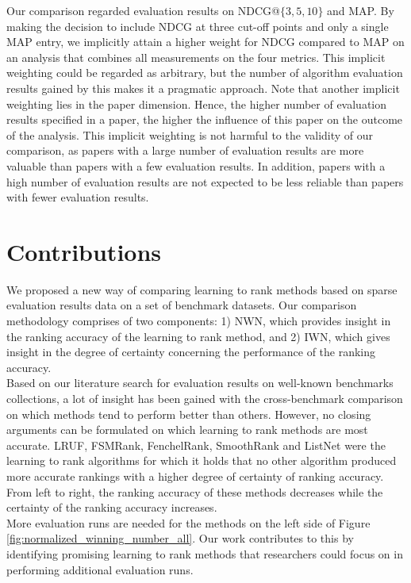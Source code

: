 \documentclass{sig-alternate}
\begin{document}
Our comparison regarded evaluation results on NDCG@$\{3,5,10\}$ and MAP. By making the decision to include NDCG at three cut-off points and only a single MAP entry, we implicitly attain a higher weight for NDCG compared to MAP on an analysis that combines all measurements on the four metrics. This implicit weighting could be regarded as arbitrary, but the number of algorithm evaluation results gained by this makes it a pragmatic approach. Note that another implicit weighting lies in the paper dimension. Hence, the higher number of evaluation results specified in a paper, the higher the influence of this paper on the outcome of the analysis. This implicit weighting is not harmful to the validity of our comparison, as papers with a large number of evaluation results are more valuable than papers with a few evaluation results. In addition, papers with a high number of evaluation results are not expected to be less reliable than papers with fewer evaluation results.

\section{Contributions}
We proposed a new way of comparing learning to rank methods based on sparse evaluation results data on a set of benchmark datasets. Our comparison methodology comprises of two components: 1) NWN, which provides insight in the ranking accuracy of the learning to rank method, and 2) IWN, which gives insight in the degree of certainty concerning the performance of the ranking accuracy.\\

Based on our literature search for evaluation results on well-known benchmarks collections, a lot of insight has been gained with the cross-benchmark comparison on which methods tend to perform better than others. However, no closing arguments can be formulated on which learning to rank methods are most accurate. LRUF, FSMRank, FenchelRank, SmoothRank and ListNet were the learning to rank algorithms for which it holds that no other algorithm produced more accurate rankings with a higher degree of certainty of ranking accuracy. From left to right, the ranking accuracy of these methods decreases while the certainty of the ranking accuracy increases.\\

More evaluation runs are needed for the methods on the left side of Figure \ref{fig:normalized_winning_number_all}. Our work contributes to this by identifying promising learning to rank methods that researchers could focus on in performing additional evaluation runs.
%
\balance

{\scriptsize}
\onecolumn
%
%
\appendix
\end{document}
